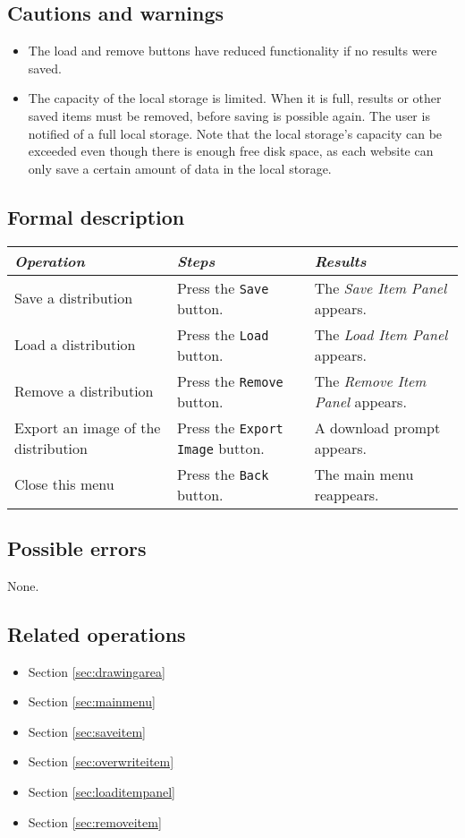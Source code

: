   \subsection*{Cautions and warnings}
  \begin{itemize}
    \item The load and remove buttons have reduced functionality if no results were saved.
    \item The capacity of the local storage is limited. When it is full, results or other saved \projectname{} items must be removed, before saving is possible again. The user is notified of a full local storage. Note that the local storage's capacity can be exceeded even though there is enough free disk space, as each website can only save a certain amount of data in the local storage.
  \end{itemize}
  
  \subsection*{Formal description}
  \begin{tabularx}{\textwidth}{XXX}
    \toprule
    \emph{Operation} & \emph{Steps} & \emph{Results} \\
    \midrule
    Save a distribution & Press the \texttt{Save} button. & The \emph{Save Item Panel} appears. \\
    \midrule
    Load a distribution & Press the \texttt{Load} button. & The \emph{Load Item Panel} appears. \\
    \midrule
    Remove a distribution & Press the \texttt{Remove} button. & The \emph{Remove Item Panel} appears. \\
    \midrule
    Export an image of the distribution & Press the \texttt{Export Image} button. & A download prompt appears. \\
    \midrule
    Close this menu & Press the \texttt{Back} button. & The main menu reappears. \\
    \bottomrule
  \end{tabularx}

  \subsection*{Possible errors}
  None.

  \subsection*{Related operations}
  \begin{itemize}
  \item Section \ref{sec:drawingarea}
    \item Section \ref{sec:mainmenu}
    \item Section \ref{sec:saveitem}
    \item Section \ref{sec:overwriteitem}
    \item Section \ref{sec:loaditempanel}
    \item Section \ref{sec:removeitem}
  \end{itemize}


